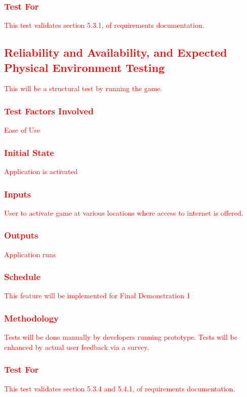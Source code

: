 \documentclass[11pt, oneside]{article}   	%
\begin{document}
\subsubsection{\textcolor{red}{Test For}}
\textcolor{red}{This test validates section 5.3.1, of requirements documentation.}


\subsection{\textcolor{red}{Reliability and Availability, and Expected Physical Environment Testing}}
\textcolor{red}{This will be a structural test by running the game.}
\subsubsection{\textcolor{red}{Test Factors Involved}}
\textcolor{red}{Ease of Use}
\subsubsection{\textcolor{red}{Initial State}}
\textcolor{red}{Application is activated}
\subsubsection{\textcolor{red}{Inputs}}
\textcolor{red}{User to activate game at various locations where access to internet is offered.}
\subsubsection{\textcolor{red}{Outputs}}
\textcolor{red}{Application runs}
\subsubsection{\textcolor{red}{Schedule}}
\textcolor{red}{This feature will be implemented for Final Demonstration 1}
\subsubsection{\textcolor{red}{Methodology}}
\textcolor{red}{Tests will be done manually by developers running prototype. Tests will be enhanced by actual user feedback via a survey.}
\subsubsection{\textcolor{red}{Test For}}
\textcolor{red}{This test validates section 5.3.4 and 5.4.1, of requirements documentation.}
\end{document}
